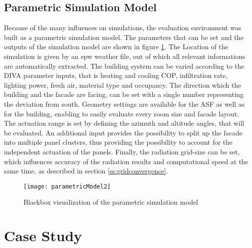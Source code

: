			

		\subsection{Parametric Simulation Model}

			Because of the many influences on simulations, the evaluation environment was built as a parametric simulation model. The parameters that can be set and the outputs of the simulation model are shown in figure \ref{fig:parametricModel}. The Location of the simulation is given by an epw weather file, out of which all relevant informations are automatically extracted. The building system can be varied according to the DIVA parameter inputs, that is heating and cooling COP, infiltration rate, lighting power, fresh air, material type and occupancy. The direction which the building and the facade are facing, can be set with a single number representing the deviation from south. Geometry settings are available for the ASF as well as for the building, enabling to easily evaluate every room size and facade layout. The actuation range is set by defining the azimuth and altitude angles, that will be evaluated. An additional input provides the possibility to split up the facade into multiple panel clusters, thus providing the possibility to account for the independent actuation of the panels. Finally, the radiation grid-size can be set, which influences accuracy of the radiation results and computational speed at the same time, as described in section \ref{ss:gridconvergence}. 

			\begin{figure}[ht] %
				\begin{center}
				\texttt{[image: parametricModel2]}
				\caption{Blackbox visualization of the parametric simulation model}
				\label{fig:parametricModel}
				\end{center} 
			\end{figure}

	\section{Case Study}

